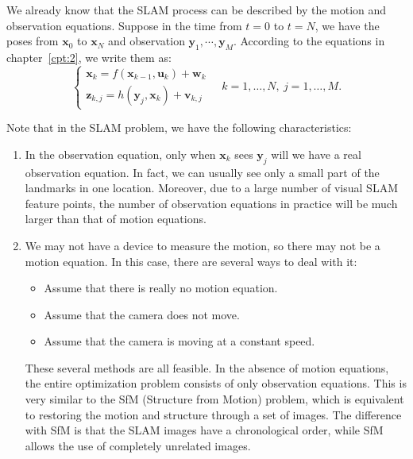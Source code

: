 We already know that the SLAM process can be described by the motion and observation equations. Suppose in the time from $t=0$ to $t=N$, we have the poses from $\mathbf{x}_0$ to $\mathbf{x}_N$ and observation $\mathbf{y}_1, \cdots, \mathbf{y}_M$. According to the equations in chapter~\ref{cpt:2}, we write them as:
\begin{equation}
	\left\{ \begin{array}{l}
		{\mathbf{x}_k} = f\left( {{\mathbf{x}_{k - 1}},{\mathbf{u}_k}} \right) + \mathbf{w}_k \\
		{\mathbf{z}_{k,j}} = h\left( {{ \mathbf{y}_j},{ \mathbf{x}_k}}  \right)+ \mathbf{v}_{k,j}
	\end{array} \right. \quad k=1, \ldots, N, \  j=1, \ldots, M.
\end{equation}

Note that in the SLAM problem, we have the following characteristics:
\begin{enumerate}
	\item In the observation equation, only when $\mathbf{x}_k$ sees $\mathbf{y}_j$ will we have a real observation equation. In fact, we can usually see only a small part of the landmarks in one location. Moreover, due to a large number of visual SLAM feature points, the number of observation equations in practice will be much larger than that of motion equations.
	\item We may not have a device to measure the motion, so there may not be a motion equation. In this case, there are several ways to deal with it:
	\begin{itemize}
		\item Assume that there is really no motion equation.
		\item Assume that the camera does not move.
		\item Assume that the camera is moving at a constant speed.
	\end{itemize}
	These several methods are all feasible. In the absence of motion equations, the entire optimization problem consists of only observation equations. This is very similar to the SfM (Structure from Motion) problem, which is equivalent to restoring the motion and structure through a set of images. The difference with SfM is that the SLAM images have a chronological order, while SfM allows the use of completely unrelated images.
\end{enumerate} 

